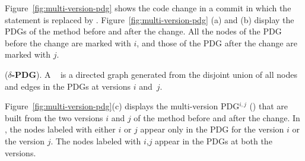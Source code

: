 
Figure~\ref{fig:multi-version-pdg} shows the code change in a commit
in which the statement  is replaced by
. Figure~\ref{fig:multi-version-pdg} (a) and
(b) display the PDGs of the method  before and after
the change. All the nodes of the PDG before the change are marked with
$i$, and those of the PDG after the change are marked with $j$.


\begin{Definition} ({\bf $\delta$-PDG}).
A {\mvpdg}~\cite{flexeme-fse20} is a directed graph generated from the
disjoint union of all nodes and edges in the PDGs at versions $i$
and~$j$.
%
\end{Definition}

Figure~\ref{fig:multi-version-pdg}(c) displays the multi-version
PDG$^{i,j}$ ({\mvpdg}) that are built from the two
versions $i$ and $j$ of the method  before and after
the change. In {\mvpdg}, the nodes labeled with either $i$
or $j$ appear only in the PDG for the version $i$ or the version $j$.
The nodes labeled with $i$,$j$ appear in the PDGs at both the
versions.


